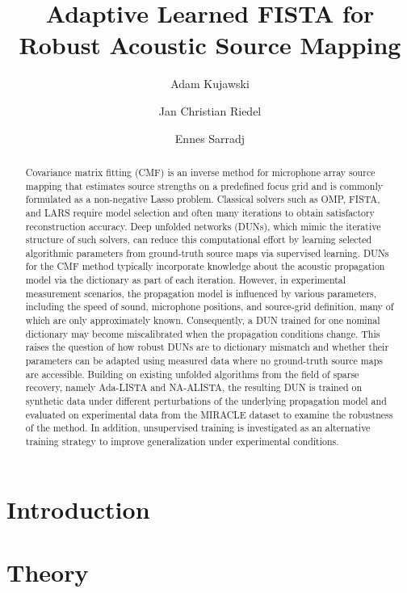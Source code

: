 \documentclass[peer-review]{fa2026}
\title{Adaptive Learned FISTA for Robust Acoustic Source Mapping}
\author[1]{Adam Kujawski}
\author[2]{Jan Christian Riedel}
\author[1]{Ennes Sarradj}
\affil[1]{Department of Engineering Acoustics, Technische Universit\"{a}t Berlin, Germany}
\affil[2]{Communications and Information Theory, Technische Universit\"{a}t Berlin, Germany}
\begin{document}
\maketitle

\begin{abstract}
Covariance matrix fitting (CMF) is an inverse method for microphone array source mapping that estimates source strengths on a predefined focus grid and is commonly formulated as a non-negative Lasso problem. Classical solvers such as OMP, FISTA, and LARS require model selection and often many iterations to obtain satisfactory reconstruction accuracy. Deep unfolded networks (DUNs), which mimic the iterative structure of such solvers, can reduce this computational effort by learning selected algorithmic parameters from ground-truth source maps via supervised learning.
DUNs for the CMF method typically incorporate knowledge about the acoustic propagation model via the dictionary as part of each iteration. However, in experimental measurement scenarios, the propagation model is influenced by various parameters, including the speed of sound, microphone positions, and source-grid definition, many of which are only approximately known. Consequently, a DUN trained for one nominal dictionary may become miscalibrated when the propagation conditions change. This raises the question of how robust DUNs are to dictionary mismatch and whether their parameters can be adapted using measured data where no ground-truth source maps are accessible.
Building on existing unfolded algorithms from the field of sparse recovery, namely Ada-LISTA and NA-ALISTA, the resulting DUN is trained on synthetic data under different perturbations of the underlying propagation model and evaluated on experimental data from the MIRACLE dataset to examine the robustness of the method. In addition, unsupervised training is investigated as an alternative training strategy to improve generalization under experimental conditions.
\end{abstract}



\section{Introduction}\label{sec:introduction}

\section{Theory}\label{sec:theory}
\end{document}
